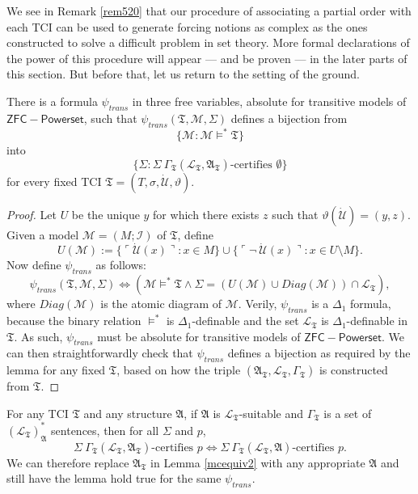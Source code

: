 \documentclass[12pt]{article}
\numberwithin{equation}{section}
\begin{document}
We see in Remark \ref{rem520} that our procedure of associating a partial order with each TCI can be used to generate forcing notions as complex as the ones constructed to solve a difficult problem in set theory. More formal declarations of the power of this procedure will appear --- and be proven --- in the later parts of this section. But before that, let us return to the setting of the ground.

\begin{lem}\label{mcequiv2}
There is a formula $\psi_{trans}$ in three free variables, absolute for transitive models of $\mathsf{ZFC - Powerset}$, such that $\psi_{trans}(\mathfrak{T}, \mathcal{M}, \Sigma)$ defines a bijection from $$\{\mathcal{M} : \mathcal{M} \models^* \mathfrak{T}\}$$ into $$\{\Sigma : \Sigma \ \Gamma_{\mathfrak{T}} (\mathcal{L}_{\mathfrak{T}}, \mathfrak{A}_{\mathfrak{T}})\text{-certifies } \emptyset\}$$ for every fixed TCI $\mathfrak{T} = (T, \sigma, \dot{\mathcal{U}}, \vartheta)$.
\end{lem}

\begin{proof}
Let $U$ be the unique $y$ for which there exists $z$ such that $\vartheta(\dot{\mathcal{U}}) = (y, z)$. Given a model $\mathcal{M} = (M; \mathcal{I})$ of $\mathfrak{T}$, define $$U(\mathcal{M}) := \{\ulcorner \dot{\mathcal{U}}(x) \urcorner : x \in M\} \cup \{\ulcorner \neg \ \dot{\mathcal{U}}(x) \urcorner : x \in U \setminus M\}.$$ Now define $\psi_{trans}$ as follows: $$\psi_{trans}(\mathfrak{T}, \mathcal{M}, \Sigma) \iff (\mathcal{M} \models^* \mathfrak{T} \wedge \Sigma = (U(\mathcal{M}) \cup Diag(\mathcal{M})) \cap \mathcal{L}_{\mathfrak{T}}),$$ where $Diag(\mathcal{M})$ is the atomic diagram of $\mathcal{M}$. Verily, $\psi_{trans}$ is a $\Delta_1$ formula, because the binary relation $\models^*$ is $\Delta_1$-definable and the set $\mathcal{L}_{\mathfrak{T}}$ is $\Delta_1$-definable in $\mathfrak{T}$. As such, $\psi_{trans}$ must be absolute for transitive models of $\mathsf{ZFC - Powerset}$. We can then straightforwardly check that $\psi_{trans}$ defines a bijection as required by the lemma for any fixed $\mathfrak{T}$, based on how the triple $(\mathfrak{A}_{\mathfrak{T}}, \mathcal{L}_{\mathfrak{T}}, \Gamma_{\mathfrak{T}})$ is constructed from $\mathfrak{T}$. 
\end{proof}

\begin{rem}\label{swapA}
For any TCI $\mathfrak{T}$ and any structure $\mathfrak{A}$, if $\mathfrak{A}$ is $\mathcal{L}_{\mathfrak{T}}$-suitable and $\Gamma_{\mathfrak{T}}$ is a set of $(\mathcal{L}_{\mathfrak{T}})^*_{\mathfrak{A}}$ sentences, then for all $\Sigma$ and $p$, $$\Sigma \ \Gamma_{\mathfrak{T}} (\mathcal{L}_{\mathfrak{T}}, \mathfrak{A}_{\mathfrak{T}})\text{-certifies } p \iff \Sigma \ \Gamma_{\mathfrak{T}} (\mathcal{L}_{\mathfrak{T}}, \mathfrak{A})\text{-certifies } p.$$ We can therefore replace $\mathfrak{A}_{\mathfrak{T}}$ in Lemma \ref{mcequiv2} with any appropriate $\mathfrak{A}$ and still have the lemma hold true for the same $\psi_{trans}$.
\end{rem}
\end{document}
